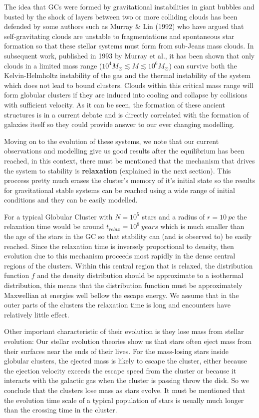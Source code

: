 The idea that GCs were formed by gravitational instabilities in giant bubbles and busted by the shock of layers between two or more colliding clouds has been defended by some authors such as Murray \& Lin (1992) who have argued that self-gravitating clouds are unstable to fragmentations and spontaneous star formation so that these stellar systems must form from sub-Jeans mass clouds. In subsequent work, published in 1993 by Murray et al., it has been shown that only clouds in a limited mass range ($10^{4}M_\odot\lesssim M\lesssim 10^{6}M_\odot$) can survive both the Kelvin-Helmholtz instability of the gas and the thermal instability of the system which does not lead to bound clusters. Clouds within this critical mass range will form globular clusters if they are induced into cooling and collapse by collisions with sufficient velocity. As it can be seen, the formation of these ancient structures is in a current debate and is directly correlated with the formation of galaxies itself so they could provide answer to our ever changing modelling. 

Moving on to the evolution of these systems, we note that our current observations and modelling give us good results after the equilibrium has been reached, in this context, there must be mentioned that the mechanism that drives the system to stability is \textbf{relaxation} (explained in the next section). This proccess pretty much erases the cluster's memory of it's initial state so the results for gravitational stable systems can be reached using a wide range of initial conditions and they can be easily modelled.

For a typical Globular Cluster with $N=10^{5}$ stars and a radius of $r=10\:pc$ the relaxation time would be around $t_{relax}=10^{9}\:years$ which is much smaller than the age of the stars in the GC so that stability can (and is observed to) be easily reached. Since the relaxation time is inversely proportional to density, then evolution due to this mechanism proceeds most rapidly in the dense central regions of the clusters. Within this central region that is relaxed, the distribution function $f$ and the density distribution should be approximate to a isothermal distribution, this means that the distribution function must be approximately Maxwellian at energies well bellow the escape energy. We assume that in the outer parts of the clusters the relaxation time is long and encounters have relatively little effect.

Other important characteristic of their evolution is they lose mass from stellar evolution: Our stellar evolution theories show us that stars often eject mass from their surfaces near the ends of their lives. For the mass-losing stars inside globular clusters, the ejected mass is likely to escape the cluster, either because the ejection velocity exceeds the escape speed from the cluster or because it interacts with the galactic gas when the cluster is passing throw the disk. So we conclude that the clusters lose mass as stars evolve. It must be mentioned that the evolution time scale of a typical population of stars is usually much longer than the crossing time in the cluster.

